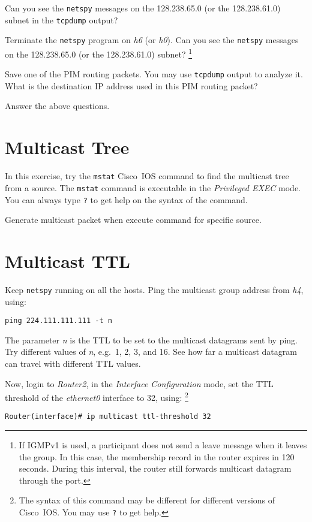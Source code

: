 \documentclass{../UTNetLab}
\begin{document}
    Can you see the \lstinline{netspy} messages on the 128.238.65.0 (or the 128.238.61.0) subnet in the \lstinline{tcpdump} output? 

    Terminate the \lstinline{netspy} program on \textit{h6} (or \textit{h0}).
    Can you see the \lstinline{netspy} messages on the 128.238.65.0 (or the 128.238.61.0) subnet?
    \footnote{If IGMPv1 is used, a participant does not send a leave message when it leaves the group.
    In this case, the membership record in the router expires in 120 seconds.
    During this interval, the router still forwards multicast datagram through the port.} 

    Save one of the PIM routing packets.
    You may use \lstinline{tcpdump} output to analyze it.
    What is the destination IP address used in this PIM routing packet?
    
    \begin{report}
    \item Answer the above questions.
    \end{report}

\section{Multicast Tree}
    In this exercise, try the \lstinline[language={cisco}]{mstat} Cisco~IOS command to find the multicast tree from a source.
    The \lstinline[language={cisco}]{mstat} command is executable in the \textit{Privileged EXEC} mode.
    You can always type \lstinline[language={cisco}]{?} to get help on the syntax of the command.

    Generate multicast packet when execute command for specific source.

\section{Multicast TTL}
    Keep \lstinline{netspy} running on all the hosts.
    Ping the multicast group address from \textit{h4}, using: 
    \begin{lstlisting}[emph={n}]
ping 224.111.111.111 -t n
    \end{lstlisting}

    The parameter \textit{n} is the TTL to be set to the multicast datagrams sent by ping.
    Try different values of \textit{n}, e.g.\ 1, 2, 3, and 16.
    See how far a multicast datagram can travel with different TTL values.

    Now, login to \textit{Router2}, in the \textit{Interface Configuration} mode, set the TTL threshold of the \textit{ethernet0} interface to 32, using: 
    \footnote{The syntax of this command may be different for different versions of Cisco~IOS.
    You may use \lstinline[language={cisco}]{?} to get help.}
    \begin{lstlisting}[language={cisco}]    
Router(interface)# ip multicast ttl-threshold 32
    \end{lstlisting}
\end{document}
